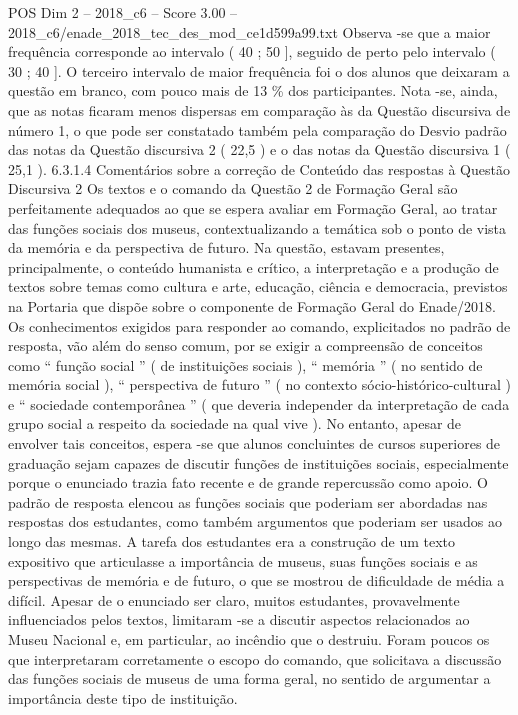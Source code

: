 \begin{textsample}{POS Dim 2 – 2018\_c6 – Score 3.00 – 2018\_c6/enade\_2018\_tec\_des\_mod\_ce1d599a99.txt}
Observa -se que a maior frequência corresponde ao intervalo ( 40 ; 50 ], seguido de perto pelo intervalo ( 30 ; 40 ].
O terceiro intervalo de maior frequência foi o dos alunos que deixaram a questão em branco, com pouco mais de 13 \% dos participantes.
Nota -se, ainda, que as notas ficaram menos dispersas em comparação às da Questão discursiva de número 1, o que pode ser constatado também pela comparação do Desvio padrão das notas da Questão discursiva 2 ( 22,5 ) e o das notas da Questão discursiva 1 ( 25,1 ). 6.3.1.4 Comentários sobre a correção de Conteúdo das respostas à Questão Discursiva 2 Os textos e o comando da Questão 2 de Formação Geral são perfeitamente adequados ao que se espera avaliar em Formação Geral, ao tratar das funções sociais dos museus, contextualizando a temática sob o ponto de vista da memória e da perspectiva de futuro.
Na questão, estavam presentes, principalmente, o conteúdo humanista e crítico, a interpretação e a produção de textos sobre temas como cultura e arte, educação, ciência e democracia, previstos na Portaria que dispõe sobre o componente de Formação Geral do Enade/2018.
Os conhecimentos exigidos para responder ao comando, explicitados no padrão de resposta, vão além do senso comum, por se exigir a compreensão de conceitos como “ função social ” ( de instituições sociais ), “ memória ” ( no sentido de memória social ), “ perspectiva de futuro ” ( no contexto sócio-histórico-cultural ) e “ sociedade contemporânea ” ( que deveria independer da interpretação de cada grupo social a respeito da sociedade na qual vive ).
No entanto, apesar de envolver tais conceitos, espera -se que alunos concluintes de cursos superiores de graduação sejam capazes de discutir funções de instituições sociais, especialmente porque o enunciado trazia fato recente e de grande repercussão como apoio.
O padrão de resposta elencou as funções sociais que poderiam ser abordadas nas respostas dos estudantes, como também argumentos que poderiam ser usados ao longo das mesmas.
A tarefa dos estudantes era a construção de um texto expositivo que articulasse a importância de museus, suas funções sociais e as perspectivas de memória e de futuro, o que se mostrou de dificuldade de média a difícil.
Apesar de o enunciado ser claro, muitos estudantes, provavelmente influenciados pelos textos, limitaram -se a discutir aspectos relacionados ao Museu Nacional e, em particular, ao incêndio que o destruiu.
Foram poucos os que interpretaram corretamente o escopo do comando, que solicitava a discussão das funções sociais de museus de uma forma geral, no sentido de argumentar a importância deste tipo de instituição.

\end{textsample}
